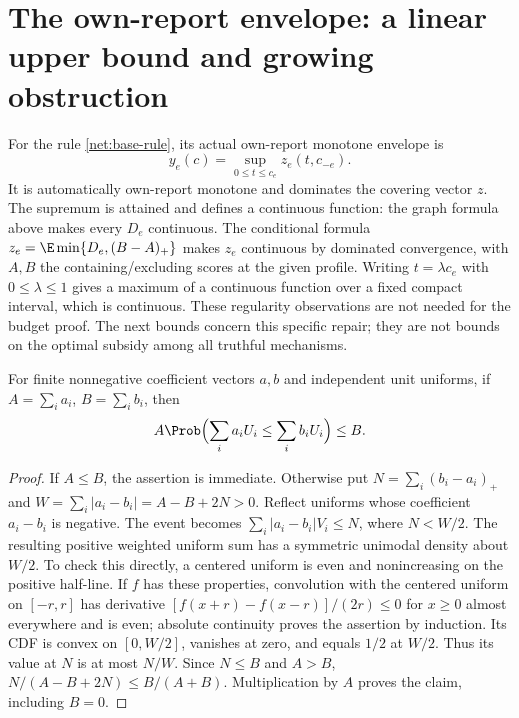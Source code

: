 \section{The own-report envelope: a linear upper bound and growing obstruction}
\label{net:envelope}
For the rule \eqref{net:base-rule}, its actual own-report monotone envelope is
\[
 y_e(c)=\sup_{0\le t\le c_e}z_e(t,c_{-e}).
\]
It is automatically own-report monotone and dominates the covering vector $z$.
The supremum is attained and defines a continuous function: the graph formula
above makes every $D_e$ continuous.  The conditional formula
$z_e=\E\min\{D_e,(B-A)_+\}$ makes $z_e$ continuous by dominated
convergence, with $A,B$ the containing/excluding scores at the given profile.
Writing $t=\lambda c_e$ with $0\le\lambda\le1$ gives a maximum of a
continuous function over a fixed compact interval, which is continuous.
These regularity observations are not needed for the budget proof.
The next bounds concern this specific repair; they are not bounds on the
optimal subsidy among all truthful mechanisms.

\begin{lemma}\label{net:uniform-comparison}
For finite nonnegative coefficient vectors $a,b$ and independent unit
uniforms, if $A=\sum_i a_i$, $B=\sum_i b_i$, then
\[
 A\Prob\Bigl(\sum_i a_iU_i\le\sum_i b_iU_i\Bigr)\le B.
\]
\end{lemma}
\begin{proof}
If $A\le B$, the assertion is immediate.  Otherwise put
$N=\sum_i(b_i-a_i)_+$ and $W=\sum_i|a_i-b_i|=A-B+2N>0$.
Reflect uniforms whose coefficient $a_i-b_i$ is negative.  The event becomes
$\sum_i|a_i-b_i|V_i\le N$, where $N<W/2$.
The resulting positive weighted uniform sum has a symmetric unimodal density
about $W/2$.  To check this directly, a centered uniform is even and
nonincreasing on the positive half-line.  If $f$ has these properties,
convolution with the centered uniform on $[-r,r]$ has derivative
$[f(x+r)-f(x-r)]/(2r)\le0$ for $x\ge0$ almost everywhere and is even;
absolute continuity proves the assertion by induction.
Its CDF is convex on $[0,W/2]$, vanishes at zero, and equals $1/2$ at $W/2$.
Thus its value at $N$ is at most $N/W$.
Since $N\le B$ and $A>B$, $N/(A-B+2N)\le B/(A+B)$.
Multiplication by $A$ proves the claim, including $B=0$.
\end{proof}

